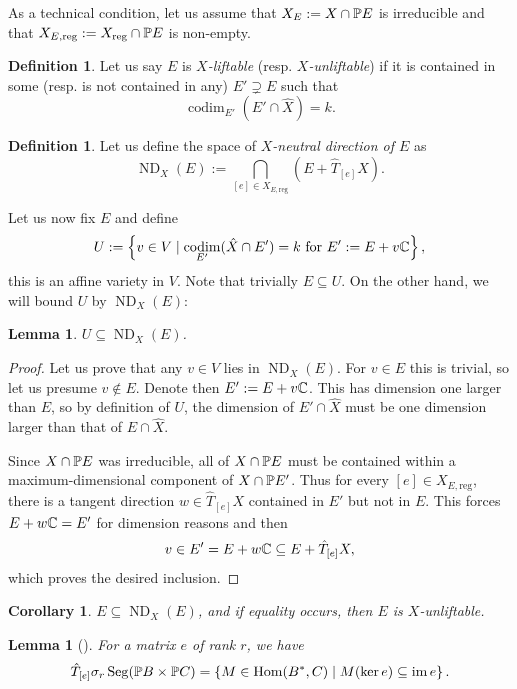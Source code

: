 \documentclass[a4paper,10pt]{article}
\def\reg{\text{reg}}
\def\set#1{\left\{#1\right\}}
\DeclareMathOperator{\Hom}{Hom}\let\hom\Hom
\DeclareMathOperator{\im}{im}
\DeclareMathOperator{\codim}{codim}
\DeclareMathOperator{\ND}{ND}
\DeclareMathOperator{\Seg}{Seg}
\newtheorem{lemma}[theorem]{Lemma}
\newtheorem{corollary}[theorem]{Corollary}
\theoremstyle{definition}
\newtheorem{definition}[theorem]{Definition}
\theoremstyle{remark}
\begin{document}
As a technical condition, let us assume that $X_E := X\cap \pe E$ is irreducible and that $X_{E,\reg} := X_\reg\cap \pe E$ is non-empty.

\begin{definition}
    Let us say $E$ is \emph{$X$-liftable} (resp. \emph{$X$-unliftable}) if it is contained in some (resp. is not contained in any) $E'\supsetneq E$ such that
    \[
        \codim_{E'} (E'\cap \hat X) = k.
    \]
\end{definition}

\begin{definition}
    Let us define the space of \emph{$X$-neutral direction of $E$} as
    \[
        \ND_X(E) := \bigcap_{[e]\in X_{E,\reg}}(E+\hat T_{[e]}X).
    \]
\end{definition}

Let us now fix $E$ and define
\[
    U := \set{v\in V\mid \text{$\codim_{E'}(\hat X\cap E')=k$ for $E':= E+v\ce$}},
\]
this is an affine variety in $V$. Note that trivially $E\subseteq U$. On the other hand, we will bound $U$ by $\ND_X(E)$:

\begin{lemma}
    \label{lem:general}
    $U\subseteq \ND_X(E)$.
\end{lemma}
\begin{proof}
    Let us prove that any $v\in V$ lies in $\ND_X(E)$. For $v\in E$ this is trivial, so let us presume $v\notin E$. Denote then $E':= E+v\ce$. This has dimension one larger than $E$, so by definition of $U$,  the dimension of $E'\cap \hat X$ must be one dimension larger than that of $E\cap \hat X$.

    Since $X\cap \pe E$ was irreducible, all of $X\cap \pe E$ must be contained within a maximum-dimensional component of $X\cap \pe E'$.
    Thus for every $[e]\in X_{E,\reg}$, there is a tangent direction $w\in\hat T_{[e]} X$ contained in $E'$ but not in $E$. This forces $E+w\ce = E'$ for dimension reasons and then
    \[
        v \in E' = E+w\ce \subseteq E+\hat T_{[e]} X,
    \]
    which proves the desired inclusion.
\end{proof}

\begin{corollary}
    \label{cor:criterion}
    $E\subseteq \ND_X(E)$, and if equality occurs, then $E$ is $X$-unliftable.
\end{corollary}



\begin{lemma}[{\cite[Lemma 9.]{draisma}}]
    \label{lem:secant-segre-tangent}
    For a matrix $e$ of rank $r$, we have \[\hat T_{[e]}\sigma_r\Seg(\pe B\times\pe C) = \set{M\in \Hom(B^*, C)\mid M(\ker e)\subseteq \im e}.\]
\end{lemma}
\end{document}
